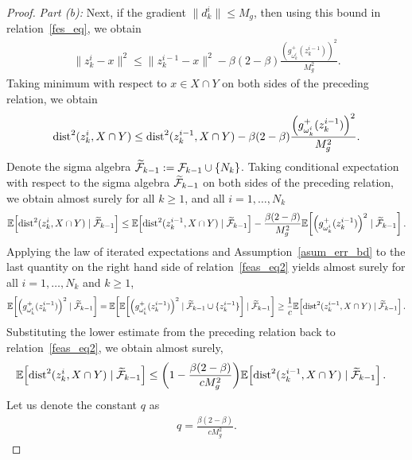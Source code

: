 \documentclass{article}
\def\cF{{\cal F}}
\def\dist{{\rm dist}}
\newcommand{\EXP}[1]
{\mathbb{E}\!\left[#1\right] }
\theoremstyle{plain}
\theoremstyle{definition}
\theoremstyle{remark}
\begin{document}
\begin{proof}
\textit{Part (b):} Next, if the gradient $\|d_k^i\| \leq M_g$, then using this bound in relation~\eqref{fes_eq}, we obtain
\begin{align}
    \| z_k^i - x \|^2 \leq \|z_{k}^{i-1} - x\|^2 - \beta(2- \beta) \frac{\left(g^+_{\omega_{k}^{i}}(z_{k}^{i-1})\right)^2}{M_g^2} . \label{eq_fes1}
\end{align}
Taking minimum with respect to $x \in X \cap Y$ on both sides of the preceding relation, we obtain
\begin{align}
    \dist^2(z_k^i, X \cap Y) \leq \dist^2(z_{k}^{i-1}, X \cap Y) - \beta(2- \beta) \frac{\left(g^+_{\omega_{k}^{i}}(z_{k}^{i-1})\right)^2}{M_g^2} . \nonumber
\end{align}
Denote the sigma algebra $\widetilde \cF_{k-1} : = \cF_{k-1} \cup \{N_k\}$.
Taking conditional expectation with respect to the sigma algebra $\widetilde \cF_{k-1}$ on both sides of the preceding relation, we obtain almost surely for all $k \geq 1$, and all $i=1,\ldots,N_k$
\begin{align}
    \EXP{\dist^2(z_k^i, X \cap Y) \mid \widetilde \cF_{k-1}} \leq \EXP{\dist^2(z_{k}^{i-1}, X \cap Y) \mid \widetilde \cF_{k-1}} - \frac{\beta(2- \beta)}{M_g^2} \EXP{\left(g^+_{\omega_{k}^{i}}(z_{k}^{i-1})\right)^2 \mid \widetilde \cF_{k-1}} . \label{feas_eq2}
\end{align}
Applying the law of iterated expectations and Assumption~\ref{asum_err_bd} to the last quantity on the right hand side of relation~\eqref{feas_eq2} yields almost surely for all $i = 1, \ldots, N_k$ and $k \geq 1$,
\begin{align}
    \EXP{\left(g^+_{\omega_{k}^{i}}(z_{k}^{i-1})\right)^2 \mid \widetilde \cF_{k-1}} = \EXP{ \EXP{\left(g^+_{\omega_{k}^{i}}(z_{k}^{i-1})\right)^2 \mid \widetilde \cF_{k-1} \cup \{z_k^{i-1}\}} \mid \widetilde \cF_{k-1}} \geq \frac{1}{c} \EXP{\dist^2(z_k^{i-1}, X \cap Y) \mid \widetilde \cF_{k-1}} . \label{feas_new_eq1}
\end{align}
Substituting the lower estimate from the preceding relation back to relation~\eqref{feas_eq2}, we obtain almost surely,
\begin{align}
    \EXP{\dist^2(z_k^i, X \cap Y) \mid \widetilde \cF_{k-1}} \leq \left( 1 - \frac{\beta(2- \beta)}{c M_g^2} \right) &\EXP{\dist^2(z_{k}^{i-1}, X \cap Y) \mid \widetilde \cF_{k-1}} . \label{eq_feas5}
\end{align}
Let us denote the constant $q$ as
\begin{align}
    q = \frac{\beta(2- \beta)}{c M_g^2} . \label{const_q}
\end{align}

\end{proof}
\end{document}
